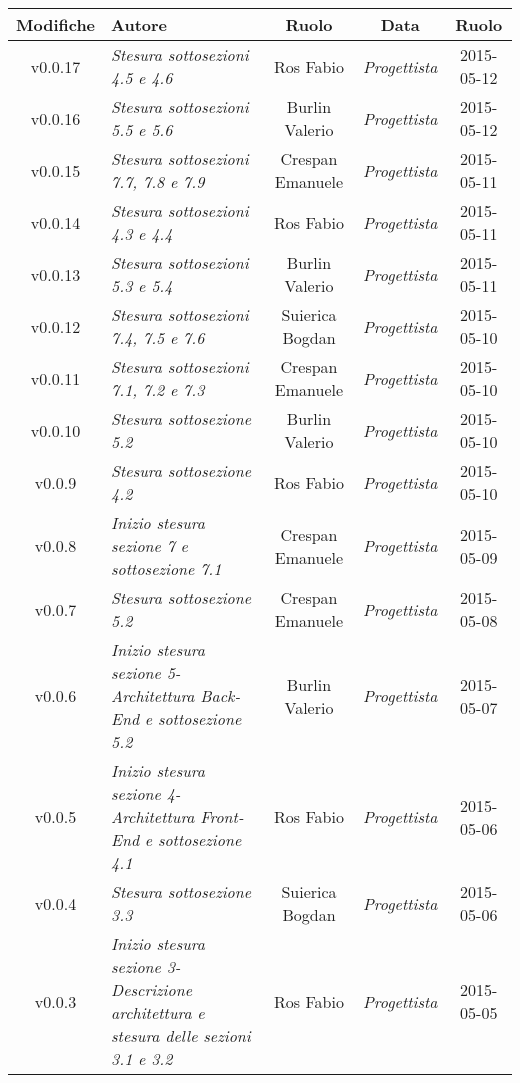 \begin{table}[h]
\centering
\begin{tabular}{|c|p{}|c|c|c|}
	\toprule
	\textbf{Modifiche} & \textbf{Autore} & \textbf{Ruolo} & \textbf{Data} & \textbf{Ruolo} \\
	\midrule
	\midrule
		v0.0.17 & \textit{Stesura sottosezioni 4.5 e 4.6} & Ros Fabio & \textit{Progettista} & 2015-05-12\\
	\midrule
		v0.0.16 & \textit{Stesura sottosezioni 5.5 e 5.6} & Burlin Valerio & \textit{Progettista} & 2015-05-12\\
	\midrule
		v0.0.15 & \textit{Stesura sottosezioni 7.7, 7.8 e 7.9} & Crespan Emanuele & \textit{Progettista} & 2015-05-11\\
	\midrule
		v0.0.14 & \textit{Stesura sottosezioni 4.3 e 4.4} & Ros Fabio & \textit{Progettista} & 2015-05-11\\
	\midrule
		v0.0.13 & \textit{Stesura sottosezioni 5.3 e 5.4} & Burlin Valerio & \textit{Progettista} & 2015-05-11\\
	\midrule
		v0.0.12 & \textit{Stesura sottosezioni 7.4, 7.5 e 7.6} & Suierica Bogdan & \textit{Progettista} & 2015-05-10\\
	\midrule
		v0.0.11 & \textit{Stesura sottosezioni 7.1, 7.2 e 7.3} & Crespan Emanuele & \textit{Progettista} & 2015-05-10\\
	\midrule
		v0.0.10 & \textit{Stesura sottosezione 5.2} & Burlin Valerio & \textit{Progettista} & 2015-05-10\\
	\midrule
		v0.0.9 & \textit{Stesura sottosezione 4.2} & Ros Fabio & \textit{Progettista} & 2015-05-10\\
	\midrule
		v0.0.8 & \textit{Inizio stesura sezione 7 e sottosezione 7.1} & Crespan Emanuele & \textit{Progettista} & 2015-05-09\\
	\midrule
		v0.0.7 & \textit{Stesura sottosezione 5.2} & Crespan Emanuele & \textit{Progettista} & 2015-05-08\\
	\midrule
		v0.0.6 & \textit{Inizio stesura sezione 5-Architettura Back-End e sottosezione 5.2} & Burlin Valerio & \textit{Progettista} & 2015-05-07\\
	\midrule
		v0.0.5 & \textit{Inizio stesura sezione 4-Architettura Front-End e sottosezione 4.1} & Ros Fabio & \textit{Progettista} & 2015-05-06\\
	\midrule
		v0.0.4 & \textit{Stesura sottosezione 3.3} & Suierica Bogdan & \textit{Progettista} & 2015-05-06\\
	\midrule
		v0.0.3 & \textit{Inizio stesura sezione 3-Descrizione architettura e stesura delle sezioni 3.1 e 3.2} & Ros Fabio & \textit{Progettista} & 2015-05-05\\
	\bottomrule
\end{tabular}
\end{table}

